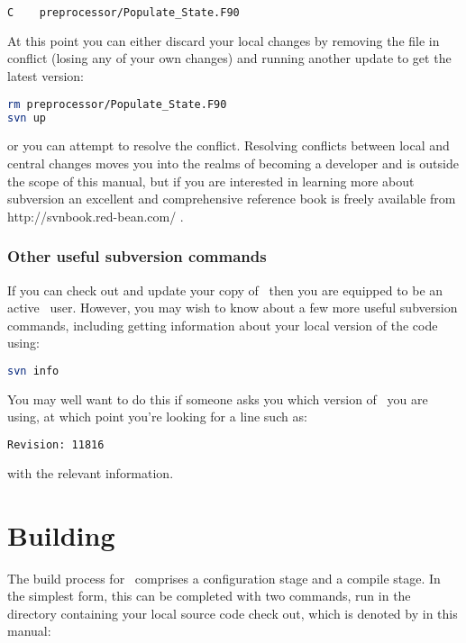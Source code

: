\begin{lstlisting}[language=Bash]
C    preprocessor/Populate_State.F90
\end{lstlisting}

At this point you can either discard your local changes by removing the file in
conflict (losing any of your own changes) and running another update to get the
latest version:

\begin{lstlisting}[language=Bash]
rm preprocessor/Populate_State.F90
svn up
\end{lstlisting}

or you can attempt to resolve the conflict. Resolving conflicts between local
and central changes moves you into the realms of becoming a developer and is
outside the scope of this manual, but if you are interested in learning more
about subversion an excellent and comprehensive reference book is freely
available from http://svnbook.red-bean.com/ .

\subsubsection{Other useful subversion commands}
\label{sect:subversion_extras}

If you can check out and update your copy of \fluidity\ then you are equipped to
be an active \fluidity\ user. However, you may wish to know about a few more
useful subversion commands, including getting information about your local
version of the code using:

\begin{lstlisting}[language=Bash]
svn info
\end{lstlisting}

You may well want to do this if someone asks you which version of \fluidity\ you
are using, at which point you're looking for a line such as:

\begin{lstlisting}[language=Bash]
Revision: 11816
\end{lstlisting}

with the relevant information.

\section{Building \fluidity}
\label{sect:building_fluidity}

The build process for \fluidity\ comprises a configuration stage and a compile
stage. In the simplest form, this can be completed with two commands, run in
the directory containing your local source code check out, which is denoted
by \fluiditysourcepath in this manual:

